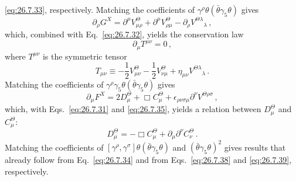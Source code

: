 \eqref{eq:26.7.33}, respectively. Matching the coefficients of
\(\gamma^\rho\theta(\bar\theta\gamma_5\theta)\) gives
\begin{equation}
  \partial_\rho G^X
  =\partial^\mu V_{\mu\rho}^\Theta
   +\partial^\mu V_{\rho\mu}^\Theta
   -\partial_\rho V^{\Theta\lambda}{}_\lambda\,,
  \tag{26.7.40}\label{eq:26.7.40}
\end{equation}
which, combined with Eq.~\eqref{eq:26.7.32}, yields the conservation law
\begin{equation}
  \partial_\mu T^{\mu\nu}=0\,,
  \tag{26.7.41}\label{eq:26.7.41}
\end{equation}
where \(T^{\mu\nu}\) is the symmetric tensor
\begin{equation}
  T_{\mu\nu}
  \equiv-\frac12V_{\mu\nu}^\Theta-\frac12V_{\nu\mu}^\Theta
         +\eta_{\mu\nu}V^{\Theta\lambda}{}_\lambda\,.
  \tag{26.7.42}\label{eq:26.7.42}
\end{equation}
Matching the coefficients of
\(\gamma^\rho\gamma_5\theta(\bar\theta\gamma_5\theta)\) gives
\begin{equation}
  \partial_\mu F^X
  =2D_\mu^\Theta+\Box C_\mu^\Theta
   +\epsilon_{\rho\nu\sigma\mu}\partial^\nu
    V^{\Theta\rho\sigma}\,,
  \tag{26.7.43}\label{eq:26.7.43}
\end{equation}
which, with Eqs.~\eqref{eq:26.7.31} and \eqref{eq:26.7.35}, yields a relation
between \(D_\mu^\Theta\) and \(C_\mu^\Theta\):
\begin{equation}
  D_\mu^\Theta
  =-\Box C_\mu^\Theta+\partial_\mu\partial^\nu C_\nu^\Theta\,.
  \tag{26.7.44}\label{eq:26.7.44}
\end{equation}
Matching the coefficients of
\([\gamma^\rho,\gamma^\sigma]\theta(\bar\theta\gamma_5\theta)\) and
\((\bar\theta\gamma_5\theta)^2\) gives results that already follow from
Eq.~\eqref{eq:26.7.34} and from Eqs.~\eqref{eq:26.7.38} and
\eqref{eq:26.7.39}, respectively.

